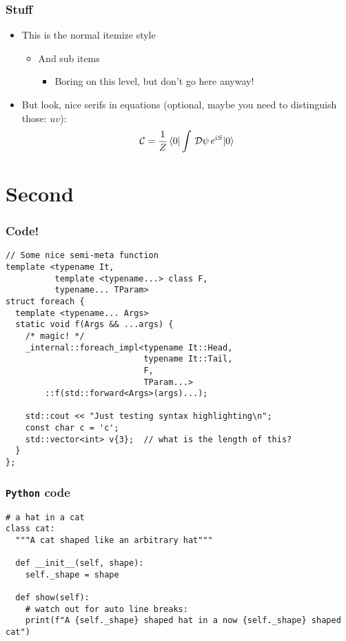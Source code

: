\documentclass[mathserif, fleqn]{beamer}
\begin{document}
\begin{frame}\frametitle{Stuff}
  \begin{itemize}
  \item This is the normal itemize style
    \begin{itemize}
    \item And sub items
      \begin{itemize}
      \item Boring on this level, but don't go here anyway!
      \end{itemize}
    \end{itemize}

  \item But look, nice serifs in equations (optional, maybe you need to distinguish those: $uv$):
    \begin{align*}
      \mathcal{C} = \frac1{Z} \braket{0|\int\,\mathcal{D}\psi\,e^{\mathrm{i} S}|0}
    \end{align*}
  \end{itemize}
\end{frame}

\section{Second}
\begin{frame}[fragile]\frametitle{Code!}
  \begin{lstlisting}[caption={A test C++ listing}]
// Some nice semi-meta function
template <typename It,
          template <typename...> class F,
          typename... TParam>
struct foreach {
  template <typename... Args>
  static void f(Args && ...args) {
    /* magic! */
    _internal::foreach_impl<typename It::Head,
                            typename It::Tail,
                            F,
                            TParam...>
        ::f(std::forward<Args>(args)...);

    std::cout << "Just testing syntax highlighting\n";
    const char c = 'c';
    std::vector<int> v{3};  // what is the length of this?
  }
};
  \end{lstlisting}
\end{frame}

\begin{frame}[fragile]\frametitle{\texttt{Python} code}
  \lstset{language=python}
  \begin{lstlisting}[caption={Some Python as well}]
# a hat in a cat
class cat:
  """A cat shaped like an arbitrary hat"""

  def __init__(self, shape):
    self._shape = shape

  def show(self):
    # watch out for auto line breaks:
    print(f"A {self._shape} shaped hat in a now {self._shape} shaped cat")
  \end{lstlisting}
\end{frame}
\end{document}
